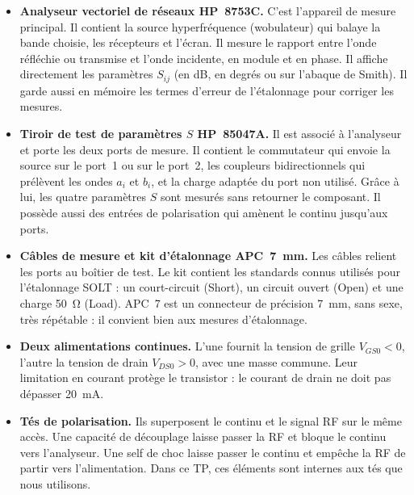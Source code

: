 \documentclass[12pt,a4paper]{article}
\begin{document}
\begin{itemize}
  \item \textbf{Analyseur vectoriel de réseaux HP~8753C.} C’est l’appareil de mesure principal.
        Il contient la source hyperfréquence (wobulateur) qui balaye la bande choisie, les
        récepteurs et l’écran. Il mesure le rapport entre l’onde réfléchie ou transmise et
        l’onde incidente, en module et en phase. Il affiche directement les paramètres $S_{ij}$
        (en dB, en degrés ou sur l’abaque de Smith). Il garde aussi en mémoire les termes
        d’erreur de l’étalonnage pour corriger les mesures.

  \item \textbf{Tiroir de test de paramètres $S$ HP~85047A.} Il est associé à l’analyseur et
        porte les deux ports de mesure. Il contient le commutateur qui envoie la source sur le
        port~1 ou sur le port~2, les coupleurs bidirectionnels qui prélèvent les ondes $a_i$
        et $b_i$, et la charge adaptée du port non utilisé. Grâce à lui, les quatre paramètres
        $S$ sont mesurés sans retourner le composant. Il possède aussi des entrées de
        polarisation qui amènent le continu jusqu’aux ports.

  \item \textbf{Câbles de mesure et kit d’étalonnage APC~\SI{7}{\milli\metre}.} Les câbles
        relient les ports au boîtier de test. Le kit contient les standards connus utilisés pour
        l’étalonnage SOLT : un court-circuit (Short), un circuit ouvert (Open) et une charge
        \SI{50}{\ohm} (Load). APC~7 est un connecteur de précision \SI{7}{\milli\metre}, sans
        sexe, très répétable : il convient bien aux mesures d’étalonnage.

  \item \textbf{Deux alimentations continues.} L’une fournit la tension de grille
        $V_{GS0} < 0$, l’autre la tension de drain $V_{DS0} > 0$, avec une masse commune.
        Leur limitation en courant protège le transistor : le courant de drain ne doit pas
        dépasser \SI{20}{\milli\ampere}.

  \item \textbf{Tés de polarisation.} Ils superposent le continu et le signal RF sur le même
        accès. Une capacité de découplage laisse passer la RF et bloque le continu vers
        l’analyseur. Une self de choc laisse passer le continu et empêche la RF de partir vers
        l’alimentation. Dans ce TP, ces éléments sont internes aux tés que nous utilisons.


\end{itemize}
\end{document}
